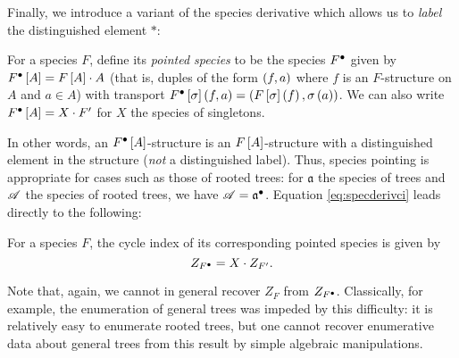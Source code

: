 \documentclass[sectionflow,singlespace,twoside]{brandiss} %
\numberwithin{section}{chapter}
\numberwithin{figure}{chapter}
\begin{document}
Finally, we introduce a variant of the species derivative which allows us to \emph{label} the distinguished element $*$:
\begin{definition}
  \label{def:specpoint}
  For a species $F$, define its \emph{pointed species} to be the species ${F}^{\bullet }$ given by ${F}^{\bullet } \left[ {A} \right] = F \left[ {A} \right] \cdot A$ (that is, duples of the form $\left( {f, a} \right)$ where $f$ is an $F$-structure on $A$ and $a \in A$) with transport ${F}^{\bullet } \left[ {\sigma} \right] \left( {f, a} \right) = \left( {F \left[ {\sigma} \right] \left( {f} \right), \sigma \left( {a} \right)} \right)$.
  We can also write ${F}^{\bullet } \left[ {A} \right] = X \cdot F'$ for $X$ the species of singletons.
\end{definition}
In other words, an ${F}^{\bullet } \left[ {A} \right]$-structure is an $F \left[ {A} \right]$-structure with a distinguished element in the structure (\emph{not} a distinguished label).
Thus, species pointing is appropriate for cases such as those of rooted trees: for $\mathfrak{a}$ the species of trees and $\mathscr{A}$ the species of rooted trees, we have $\mathscr{A} = {\mathfrak{a}}^{\bullet }$.
Equation \eqref{eq:specderivci} leads directly to the following:
\begin{theorem}
  \label{thm:specpointci}
  For a species $F$, the cycle index of its corresponding pointed species is given by
  \begin{equation}
    \label{eq:specpointci}
    Z_{{F}^{\bullet }} = X \cdot Z_{F'}.
  \end{equation}
\end{theorem}
Note that, again, we cannot in general recover $Z_{F}$ from $Z_{{F}^{\bullet }}$.
Classically, for example, the enumeration of general trees was impeded by this difficulty: it is relatively easy to enumerate rooted trees, but one cannot recover enumerative data about general trees from this result by simple algebraic manipulations.
\end{document}
